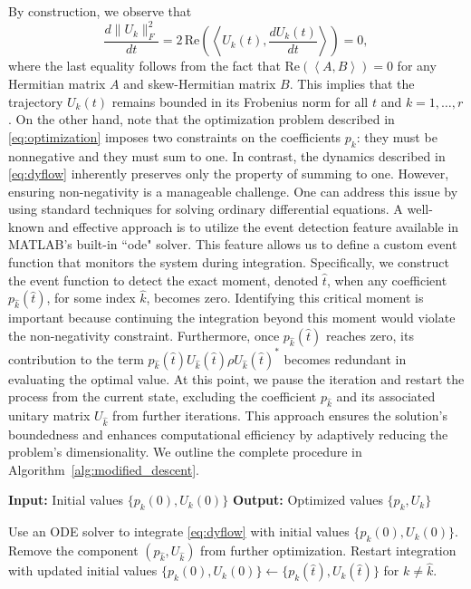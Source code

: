 \documentclass[onefignum,onetabnum]{siamart220329}
\begin{document}
    By construction, we observe that  
    \[
    \frac{d \| U_k \|^2_F}{d t} = 2 \, \mathrm{Re} \left( \left\langle U_k(t), \frac{d U_k(t)}{d t} \right\rangle \right) = 0,
    \]  
    where the last equality follows from the fact that $ \mathrm{Re} \left( \left\langle A, B \right\rangle \right) = 0$ for any Hermitian matrix $A$ and skew-Hermitian matrix $B$.  This implies that the trajectory $U_k(t)$ remains bounded in its Frobenius norm for all $t$ and $k=1,\ldots,r$. On the other hand, note that the optimization problem described in \eqref{eq:optimization} imposes two constraints on the coefficients $p_k$: they must be nonnegative and they must sum to one. In contrast, the dynamics described in \eqref{eq:dyflow} inherently preserves only the property of summing to one. However, ensuring non-negativity is a manageable challenge. One can address this issue by using standard techniques for solving ordinary differential equations. A well-known and effective approach is to utilize the event detection feature available in MATLAB's built-in ``ode" solver. This feature allows us to define a custom event function that monitors the system during integration. Specifically, we construct the event function to detect the exact moment, denoted $\hat{t}$, when any coefficient $p_{\hat{k}}(\hat{t})$, for some index $\hat{k}$, becomes zero. Identifying this critical moment is important because continuing the integration beyond this moment would violate the non-negativity constraint. Furthermore, once $p_{\hat{k}}(\hat{t})$ reaches zero, its contribution to the term $p_{\hat{k}}(\hat{t}) U_{\hat{k}}(\hat{t}) \rho U_{\hat{k}}(\hat{t})^*$ becomes redundant in evaluating the optimal value. At this point, we pause the iteration and restart the process from the current state, excluding the coefficient $p_{\hat{k}}$ and its associated unitary matrix $U_{\hat{k}}$ from further iterations. This approach ensures the solution's boundedness and enhances computational efficiency by adaptively reducing the problem's dimensionality. We outline the complete procedure in Algorithm~\ref{alg:modified_descent}.
    


\begin{algorithm}[ht]
\caption{Modified Continuous-Time Descent Flow}
\label{alg:modified_descent}
\begin{algorithmic}[1]
\State \textbf{Input:} Initial values $\{p_k(0), U_k(0)\}$
\State \textbf{Output:} Optimized values $\{p_k, U_k\}$

    \State Use an ODE solver to integrate \eqref{eq:dyflow} with initial values $\{p_k(0), U_k(0)\}$.
        \State Remove the component $(p_{\hat{k}}, U_{\hat{k}})$ from further optimization.
        \State Restart integration with updated initial values $\{p_k(0), U_k(0)\} \gets \{p_k(\hat{t}), U_k(\hat{t})\}$ for $k \neq \hat{k}$.
    \EndIf
\EndWhile
\end{algorithmic}
\end{algorithm}
\end{document}
